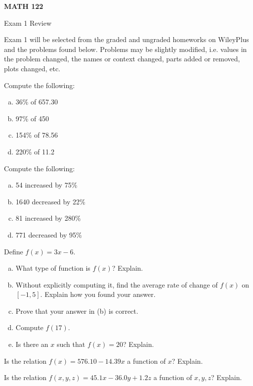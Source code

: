 \documentclass[11pt,letterpaper]{article}
\begin{document}
\begin{center} {\bfseries \Large MATH 122 \par\vspace{0.3cm} \LARGE Exam 1 Review} \end{center} \par\vspace{1cm}


Exam 1 will be selected from the graded and ungraded homeworks on WileyPlus and the problems found below. Problems may be slightly modified, i.e. values in the problem changed, the names or context changed, parts added or removed, plots changed, etc. \pspace

\prob Compute the following:
        \begin{enumerate}[(a)]
        \item 36\% of 657.30
        \item 97\% of 450
        \item 154\% of 78.56
        \item 220\% of 11.2
        \end{enumerate} \pspace


\prob Compute the following:
        \begin{enumerate}[(a)]
        \item 54 increased by 75\%
        \item 1640 decreased by 22\%
        \item 81 increased by 280\%
        \item 771 decreased by 95\%
        \end{enumerate} \pspace


\prob Define $f(x)= 3x - 6$. 
	\begin{enumerate}[(a)]
	\item What type of function is $f(x)$? Explain. 
	\item Without explicitly computing it, find the average rate of change of $f(x)$ on $[-1, 5]$. Explain how you found your answer.
	\item Prove that your answer in (b) is correct. 
	\item Compute $f(17)$.
	\item Is there an $x$ such that $f(x)= 20$? Explain. 
	\end{enumerate} \pspace


\prob Is the relation $f(x)= 576.10 - 14.39x$ a function of $x$? Explain. \pspace


\prob Is the relation $f(x, y, z)= 45.1x - 36.0y + 1.2z$ a function of $x, y, z$? Explain. \pspace
\end{document}
